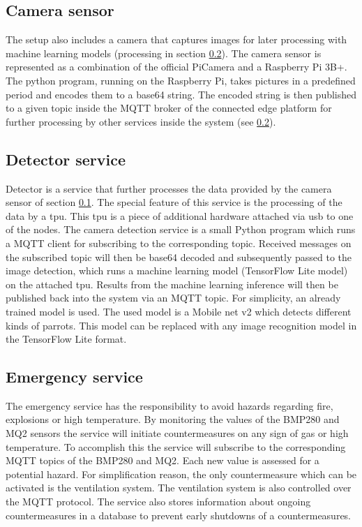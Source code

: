 \subsection{Camera sensor}\label{subsec:camera-sensor}
The setup also includes a camera that captures images for later processing with machine learning models (processing in section \ref{subsec:detector-service}). The camera sensor is represented as a combination of the official PiCamera and a Raspberry Pi 3B+. The python program, running on the Raspberry Pi, takes pictures in a predefined period and encodes them to a base64 string. The encoded string is then published to a given topic inside the MQTT broker of the connected edge platform for further processing by other services inside the system (see \ref{subsec:detector-service}).

\subsection{Detector service}\label{subsec:detector-service}
Detector is a service that further processes the data provided by the camera sensor of section \ref{subsec:camera-sensor}. The special feature of this service is the processing of the data by a \gls{tpu}. This \gls{tpu} is a piece of additional hardware attached via \gls{usb} to one of the nodes. The camera detection service is a small Python program which runs a MQTT client for subscribing to the corresponding topic. Received messages on the subscribed topic will then be base64 decoded and subsequently passed to the image detection, which runs a machine learning model (TensorFlow Lite model) on the attached \gls{tpu}. Results from the machine learning inference will then be published back into the system via an MQTT topic. For simplicity, an already trained model is used. The used model is a Mobile net v2 which detects different kinds of parrots. This model can be replaced with any image recognition model in the TensorFlow Lite format.

\subsection{Emergency service}\label{subsec:emergency-service}
The emergency service has the responsibility to avoid hazards regarding fire, explosions or high temperature. By monitoring the values of the BMP280 and MQ2 sensors the service will initiate countermeasures on any sign of gas or high temperature. To accomplish this the service will subscribe to the corresponding MQTT topics of the BMP280 and MQ2. Each new value is assessed for a potential hazard. For simplification reason, the only countermeasure which can be activated is the ventilation system. The ventilation system is also controlled over the MQTT protocol. The service also stores information about ongoing countermeasures in a database to prevent early shutdowns of a countermeasures.

